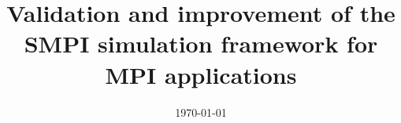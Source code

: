 \documentclass[a4paper, 11pt, oneside]{Thesis}  %
\begin{document}
\frontmatter      %

\title  {Validation and improvement of the SMPI simulation framework
  for MPI applications}
\addresses  {\groupname\\\deptname\\\univname}  %
\date       {\today}
\subject    {}
\keywords   {}

\maketitle


\fancyhead{}  %
\rhead{\thepage}  %
\lhead{}  %

\pagestyle{fancy}  %
\end{document}
